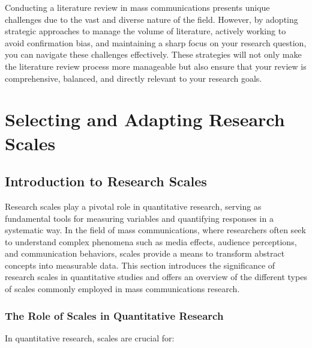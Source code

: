 \documentclass[
]{book}
\begin{document}
Conducting a literature review in mass communications presents unique challenges due to the vast and diverse nature of the field. However, by adopting strategic approaches to manage the volume of literature, actively working to avoid confirmation bias, and maintaining a sharp focus on your research question, you can navigate these challenges effectively. These strategies will not only make the literature review process more manageable but also ensure that your review is comprehensive, balanced, and directly relevant to your research goals.

\hypertarget{selecting-and-adapting-research-scales}{%
\chapter{Selecting and Adapting Research Scales}\label{selecting-and-adapting-research-scales}}

\hypertarget{introduction-to-research-scales}{%
\section{Introduction to Research Scales}\label{introduction-to-research-scales}}

Research scales play a pivotal role in quantitative research, serving as fundamental tools for measuring variables and quantifying responses in a systematic way. In the field of mass communications, where researchers often seek to understand complex phenomena such as media effects, audience perceptions, and communication behaviors, scales provide a means to transform abstract concepts into measurable data. This section introduces the significance of research scales in quantitative studies and offers an overview of the different types of scales commonly employed in mass communications research.

\hypertarget{the-role-of-scales-in-quantitative-research}{%
\subsection*{The Role of Scales in Quantitative Research}\label{the-role-of-scales-in-quantitative-research}}

In quantitative research, scales are crucial for:
\end{document}
